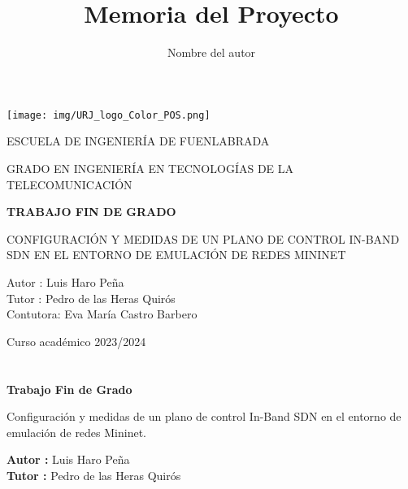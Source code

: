 \documentclass[a4paper, 12pt]{book}
\title{Memoria del Proyecto}
\author{Nombre del autor}
\begin{document}
	
	\renewcommand{\refname}{Bibliografía}  %
	\renewcommand{\appendixname}{Apéndice}
	
	
	
	\begin{titlepage}
		\begin{center}
			\texttt{[image: img/URJ\_logo\_Color\_POS.png]}
			
			\vspace{1.75cm}
			
			\LARGE
			ESCUELA DE INGENIERÍA DE FUENLABRADA
			\vspace{1cm}
			
			\LARGE
			GRADO EN INGENIERÍA EN TECNOLOGÍAS DE LA TELECOMUNICACIÓN
			
			\vspace{1cm}
			\LARGE
			\textbf{TRABAJO FIN DE GRADO}
			
			\vspace{1cm}
			
			\Large
			CONFIGURACIÓN Y MEDIDAS DE UN PLANO DE CONTROL IN-BAND SDN EN EL ENTORNO DE EMULACIÓN DE REDES MININET
			
			\vspace{2cm}
			
			\large
			Autor : Luis Haro Peña \\
			Tutor : Pedro de las Heras Quirós\\
			Contutora: Eva María Castro Barbero
			\vspace{1cm}
			
			\large
			Curso académico 2023/2024
			
		\end{center}
	\end{titlepage}
	
	\newpage
	\mbox{}
	\thispagestyle{empty} %
	
	
	
	\clearpage
	\chapter*{}
	
	\vspace{-4cm}
	\begin{center}
		\LARGE
		\textbf{Trabajo Fin de Grado}
		
		\vspace{1cm}
		\large
		Configuración y medidas de un plano de control In-Band SDN en el entorno de emulación de redes Mininet.
		
		\vspace{1cm}
		\large
		\textbf{Autor :} Luis Haro Peña \\
		\textbf{Tutor :} Pedro de las Heras Quirós
		
	\end{center}
	
\end{document}
